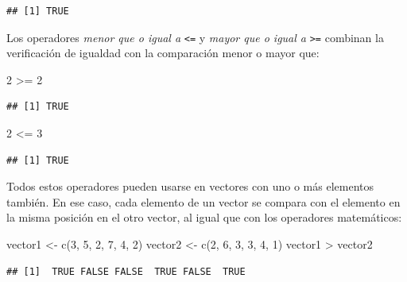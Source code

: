 \documentclass[
]{book}
\newenvironment{Shaded}{\begin{snugshade}}{\end{snugshade}}
\newcommand{\DecValTok}[1]{\textcolor[rgb]{0.00,0.00,0.81}{#1}}
\newcommand{\FunctionTok}[1]{\textcolor[rgb]{0.00,0.00,0.00}{#1}}
\newcommand{\NormalTok}[1]{#1}
\newcommand{\OtherTok}[1]{\textcolor[rgb]{0.56,0.35,0.01}{#1}}
\newcommand{\SpecialCharTok}[1]{\textcolor[rgb]{0.00,0.00,0.00}{#1}}
\begin{document}
\begin{verbatim}
## [1] TRUE
\end{verbatim}

Los operadores \emph{menor que o igual a} \texttt{\textless{}=} y \emph{mayor que o igual a} \texttt{\textgreater{}=} combinan la verificación de igualdad con la comparación menor o mayor que:

\begin{Shaded}
\begin{Highlighting}[]
\DecValTok{2} \SpecialCharTok{\textgreater{}=} \DecValTok{2}
\end{Highlighting}
\end{Shaded}

\begin{verbatim}
## [1] TRUE
\end{verbatim}

\begin{Shaded}
\begin{Highlighting}[]
\DecValTok{2} \SpecialCharTok{\textless{}=} \DecValTok{3}
\end{Highlighting}
\end{Shaded}

\begin{verbatim}
## [1] TRUE
\end{verbatim}

Todos estos operadores pueden usarse en vectores con uno o más elementos también. En ese caso, cada elemento de un vector se compara con el elemento en la misma posición en el otro vector, al igual que con los operadores matemáticos:

\begin{Shaded}
\begin{Highlighting}[]
\NormalTok{vector1 }\OtherTok{\textless{}{-}} \FunctionTok{c}\NormalTok{(}\DecValTok{3}\NormalTok{, }\DecValTok{5}\NormalTok{, }\DecValTok{2}\NormalTok{, }\DecValTok{7}\NormalTok{, }\DecValTok{4}\NormalTok{, }\DecValTok{2}\NormalTok{)}
\NormalTok{vector2 }\OtherTok{\textless{}{-}} \FunctionTok{c}\NormalTok{(}\DecValTok{2}\NormalTok{, }\DecValTok{6}\NormalTok{, }\DecValTok{3}\NormalTok{, }\DecValTok{3}\NormalTok{, }\DecValTok{4}\NormalTok{, }\DecValTok{1}\NormalTok{)}
\NormalTok{vector1 }\SpecialCharTok{\textgreater{}}\NormalTok{ vector2}
\end{Highlighting}
\end{Shaded}

\begin{verbatim}
## [1]  TRUE FALSE FALSE  TRUE FALSE  TRUE
\end{verbatim}
\end{document}
